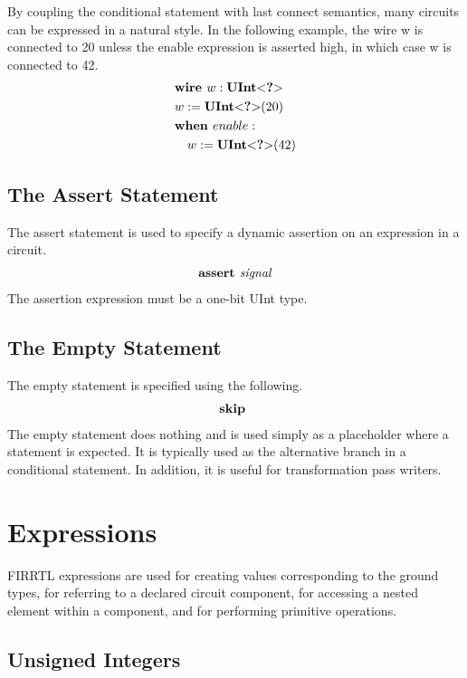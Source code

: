 \documentclass[12pt]{article}
\begin{document}
By coupling the conditional statement with last connect semantics, many circuits can be expressed in a natural style.
In the following example, the wire w is connected to 20 unless the enable expression is asserted high, in which case w is connected to 42. 
\[
\begin{aligned}
&\text{\bf wire\ } w : \text{\bf UInt}\text{\bf $<$} \text{\bf ?} \text{\bf $>$} \\
&w := \text{\bf UInt}\text{\bf $<$} \text{\bf ?} \text{\bf $>$}(20) \\
&\text{\bf when\ } enable : \\
&\quad w := \text{\bf UInt}\text{\bf $<$} \text{\bf ?} \text{\bf $>$}(42) \\
\end{aligned}
\]

\subsection{The Assert Statement}
The assert statement is used to specify a dynamic assertion on an expression in a circuit.
\[
\begin{aligned}
\text{\bf assert\ } \text{\em signal}
\end{aligned}
\]
The assertion expression must be a one-bit UInt type.

\subsection{The Empty Statement}
The empty statement is specified using the following.
\[
\begin{aligned}
\text{\bf skip\ }
\end{aligned}
\]
The empty statement does nothing and is used simply as a placeholder where a statement is expected.
It is typically used as the alternative branch in a conditional statement. 
In addition, it is useful for transformation pass writers.

\section{Expressions}

FIRRTL expressions are used for creating values corresponding to the ground types, for referring to a declared circuit component, for accessing a nested element within a component, and for performing primitive operations. 

\subsection{Unsigned Integers}
\end{document}
